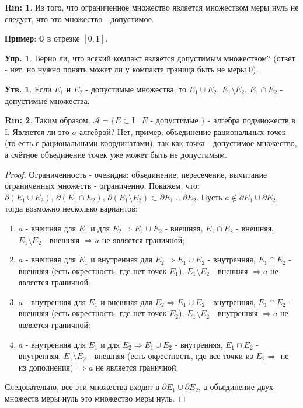 \documentclass[12pt]{article}
\newcommand{\MQ}{\mathbb{Q}}
\newcommand{\MI}{\mathrm{I}}
\theoremstyle{definition}
\newtheorem{rem}{Rm:}
\newtheorem{prop}{Утв.}
\newtheorem{exrc}{Упр.}
\begin{document}
\begin{rem}
	Из того, что ограниченное множество является множеством меры нуль не следует, что это множество - допустимое.
\end{rem}
\textbf{Пример}: $\MQ$ в отрезке $[0,1]$.

\begin{exrc}
	Верно ли, что всякий компакт является допустимым множеством? (ответ - нет, но нужно понять может ли у компакта граница быть не меры $0$).
\end{exrc}

\begin{prop}
	Если $E_1$ и $E_2$ - допустимые множества, то $E_1 \cup E_2, \, E_1 \setminus E_2, \, E_1 \cap E_2$ - допустимые множества.
\end{prop}
\begin{rem}
	Таким образом, $\mathcal{A} = \{E \subset \MI \mid E \text{ - допустимые }\}$ - алгебра подмножеств в $\MI$. Является ли это $\sigma$-алгеброй? Нет, пример: объединение рациональных точек (то есть с рациональными координатами), так как точка - допустимое множество, а счётное объединение точек уже может быть не допустимым.
\end{rem}
\begin{proof}
	Ограниченность - очевидна: объединение, пересечение, вычитание ограниченных множеств - ограниченно. Покажем, что: $\partial (E_1 \cup E_2), \, \partial(E_1 \cap E_2), \, \partial (E_1 \setminus E_2) \subset \partial E_1 \cup \partial E_2$. Пусть $a\not\in \partial E_1 \cup \partial E_2$, тогда возможно несколько вариантов:
	\begin{enumerate}[label=\arabic*)]
		\item $a$ - внешняя для $E_1$ и для $E_2 \Rightarrow E_1 \cup E_2$ - внешняя, $E_1 \cap E_2$ - внешняя, $E_1 \setminus E_2$ - внешняя $\Rightarrow a$ не является граничной;
		\item $a$ - внешняя для $E_1$ и внутренняя для $E_2 \Rightarrow E_1 \cup E_2$ - внутренняя, $E_1 \cap E_2$ - внешняя (есть окрестность, где нет точек $E_1$), $E_1 \setminus E_2$ - внешняя $\Rightarrow a$ не является граничной;
		\item $a$ - внутренняя для $E_1$ и внешняя для $E_2 \Rightarrow E_1 \cup E_2$ - внутренняя, $E_1 \cap E_2$ - внешняя (есть окрестность, где нет точек $E_2$), $E_1 \setminus E_2$ - внутренняя $\Rightarrow a$ не является граничной;
		\item $a$ - внутренняя для $E_1$ и для $E_2 \Rightarrow E_1 \cup E_2$ - внутренняя, $E_1 \cap E_2$ - внутренняя, $E_1 \setminus E_2$ - внешняя (есть окрестность, где все точки из $E_2 \Rightarrow$ не из дополнения) $\Rightarrow a$ не является граничной;
	\end{enumerate}
	Следовательно, все эти множества входят в $\partial E_1 \cup \partial E_2$, а объединение двух множеств меры нуль это множество меры нуль.
\end{proof}
\end{document}
